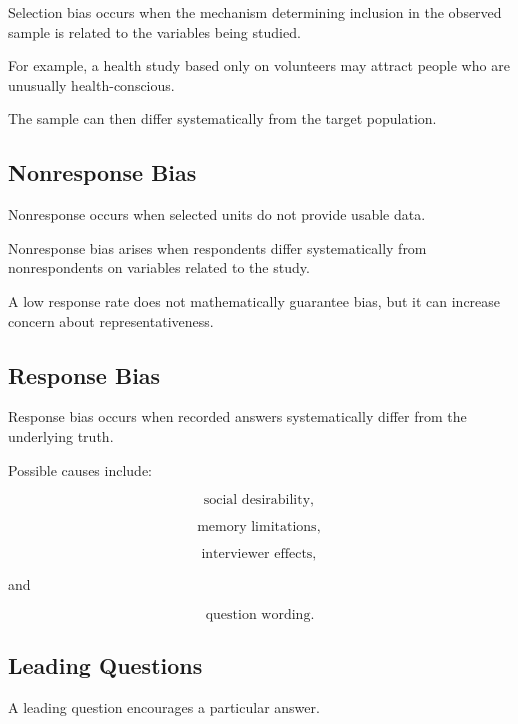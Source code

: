 Selection bias occurs when the mechanism determining inclusion in the
observed sample is related to the variables being studied.

For example, a health study based only on volunteers may attract people
who are unusually health-conscious.

The sample can then differ systematically from the target population.

\subsection{Nonresponse Bias}
\label{subsec:nonresponse-bias}

Nonresponse occurs when selected units do not provide usable data.

Nonresponse bias arises when respondents differ systematically from
nonrespondents on variables related to the study.

A low response rate does not mathematically guarantee bias, but it can
increase concern about representativeness.

\subsection{Response Bias}
\label{subsec:response-bias}

Response bias occurs when recorded answers systematically differ from
the underlying truth.

Possible causes include:

\[
\boxed{
\text{social desirability},
}
\]

\[
\boxed{
\text{memory limitations},
}
\]

\[
\boxed{
\text{interviewer effects},
}
\]

and

\[
\boxed{
\text{question wording}.
}
\]

\subsection{Leading Questions}
\label{subsec:leading-questions}

A leading question encourages a particular answer.

